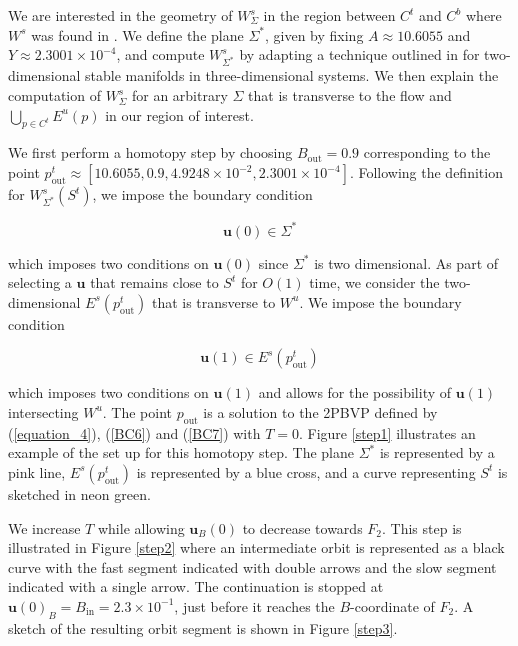 \documentclass{ws-ijbc}
\begin{document}
We are interested in the geometry of $W^{s}_{\Sigma}$ in the region between $C^t$ and $C^b$ where $W^s$ was found in \cite{QSSA}.  We define the plane $\Sigma^*$, given by fixing $A\approx10.6055$ and $Y\approx2.3001 \times 10^{-4}$, and compute $W^{s}_{\Sigma^*}$ by adapting a technique outlined in \cite{Saeed_Paper} for two-dimensional stable manifolds in three-dimensional systems.  We then explain the computation of $W^{s}_{\Sigma}$ for an arbitrary $\Sigma$ that is transverse to the flow and $\bigcup_{p \in C^t} E^u(p)$ in our region of interest.
    
We first perform a homotopy step by choosing $B_{\mathrm{out}} = 0.9$ corresponding to the point $p^t_{\text{out}}\approx[10.6055, 0.9, 4.9248 \times 10^{-2}, 2.3001 \times 10^{-4}]$.  Following the definition for $W^s_{\Sigma^*}(S^t)$, we impose the boundary condition
    
\begin{equation}
\mathbf{u}(0) \in \Sigma^*
\label{BC6}
\end{equation}
    
 \noindent
which imposes two conditions on $\mathbf{u}(0)$ since $\Sigma^*$ is two dimensional.  As part of selecting a $\mathbf{u}$ that remains close to $S^t$ for $O(1)$ time, we consider the two-dimensional $E^s(p^t_{\text{out}})$ that is transverse to $W^u$.  We impose the boundary condition
    
\begin{equation}
\mathbf{u}(1) \in E^s(p^t_{\text{out}})
\label{BC7}
\end{equation}
    
\noindent
which imposes two conditions on $\mathbf{u}(1)$ and allows for the possibility of $\mathbf{u}(1)$ intersecting $W^u$.  The point $p_{\text{out}}$ is a solution to the 2PBVP defined by (\ref{equation_4}), (\ref{BC6}) and (\ref{BC7}) with $T=0$.  Figure \ref{step1} illustrates an example of the set up for this homotopy step.  The plane $\Sigma^*$ is represented by a pink line, $E^s(p^t_{\mathrm{out}})$ is represented by a blue cross, and a curve representing $S^t$ is sketched in neon green.
    
We increase $T$ while allowing $\mathbf{u}_{B}(0)$ to decrease towards $F_2$.  This step is illustrated in Figure \ref{step2} where an intermediate orbit is represented as a black curve with the fast segment indicated with double arrows and the slow segment indicated with a single arrow.  The continuation is stopped at $\mathbf{u}(0)_B = B_{\text{in}}=2.3 \times 10^{-1}$, just before it reaches the $B$-coordinate of $F_2$.  A sketch of the resulting orbit segment is shown in Figure \ref{step3}.
    
\end{document}
